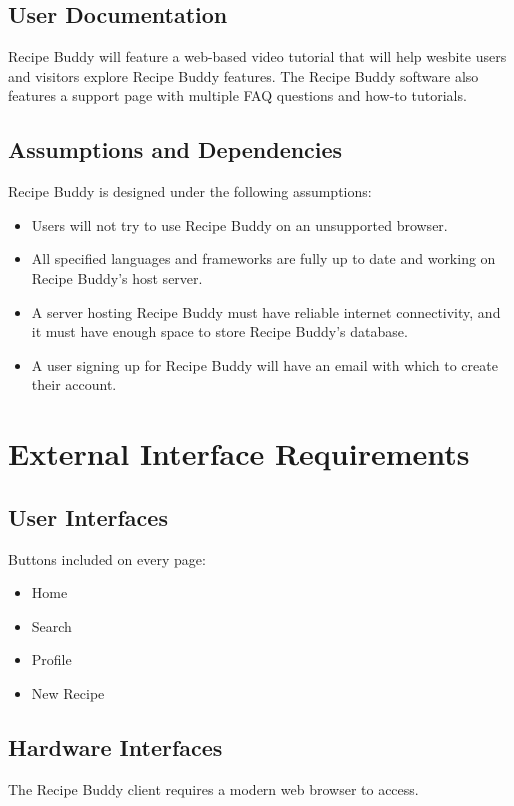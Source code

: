 \documentclass{scrreprt}
\begin{document}
\section{User Documentation}
\gls{Recipe Buddy} will feature a web-based video tutorial that will help wesbite users and visitors explore \gls{Recipe Buddy} features. The \gls{Recipe Buddy} software also features a support page with multiple FAQ questions and how-to tutorials.

\section{Assumptions and Dependencies}
\gls{Recipe Buddy} is designed under the following assumptions:
\begin{itemize}
    \item Users will not try to use \gls{Recipe Buddy} on an unsupported browser.
    \item All specified languages and frameworks are fully up to date and working on \gls{Recipe Buddy}'s host server.
    \item A server hosting \gls{Recipe Buddy} must have reliable internet connectivity, and it must have enough space to store \gls{Recipe Buddy}'s database.
    \item A user signing up for \gls{Recipe Buddy} will have an email with which to create their account.
\end{itemize}

\chapter{External Interface Requirements}

\section{User Interfaces}
Buttons included on every page:
\begin{itemize}
    \item Home
    \item Search
    \item Profile
    \item New Recipe
\end{itemize}

\section{Hardware Interfaces}
The Recipe Buddy client requires a modern web browser to access.
\end{document}
